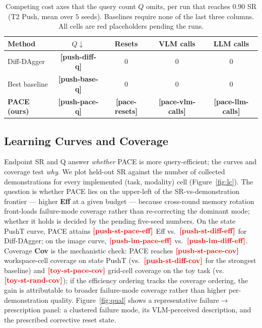 \documentclass[letterpaper]{article} %
\newcommand{\PH}[1]{{\color{red}\textbf{[#1]}}}
\begin{document}
\begin{table}[t]
\centering
\small
\caption{Competing cost axes that the query count $Q$ omits, per run that reaches
$0.90$ SR (T2 Push, mean over $5$ seeds). Baselines require none of the last three
columns. All cells are red placeholders pending the runs.}
\label{tab:cost}
\begin{tabular}{l cccc}
\toprule
Method & $Q\downarrow$ & Resets & VLM calls & LLM calls \\
\midrule
Diff-DAgger          & \PH{push-diff-q}      & $0$ & $0$ & $0$ \\
Best baseline        & \PH{push-base-q}      & $0$ & $0$ & $0$ \\
\textbf{PACE (ours)} & \PH{push-pace-q}      & \PH{pace-resets} & \PH{pace-vlm-calls} & \PH{pace-llm-calls} \\
\bottomrule
\end{tabular}
\end{table}

\subsection{Learning Curves and Coverage}

Endpoint SR and Q answer \emph{whether} PACE is more query-efficient; the curves and
coverage test \emph{why}. We plot held-out SR against the number of collected
demonstrations for every implemented (task, modality) cell (Figure~\ref{fig:lc}). The
question is whether PACE lies on the upper-left of the SR-vs-demonstration frontier
--- higher \textbf{Eff} at a given budget --- because cross-round memory rotation
front-loads failure-mode coverage rather than re-correcting the dominant mode; whether
it holds is decided by the pending five-seed numbers. On the state PushT curve, PACE
attains $\PH{push-st-pace-eff}$ Eff vs.\ $\PH{push-st-diff-eff}$ for Diff-DAgger; on
the image curve, $\PH{push-im-pace-eff}$ vs.\ $\PH{push-im-diff-eff}$. Coverage
\textbf{Cov} is the mechanistic check: PACE reaches $\PH{push-st-pace-cov}$
workspace-cell coverage on state PushT (vs.\ $\PH{push-st-diff-cov}$ for the strongest
baseline) and $\PH{toy-st-pace-cov}$ grid-cell coverage on the toy task (vs.\
$\PH{toy-st-rand-cov}$); if the efficiency ordering tracks the coverage ordering, the
gain is attributable to broader failure-mode coverage rather than higher
per-demonstration quality. Figure~\ref{fig:qual} shows a representative
failure$\to$prescription panel: a clustered failure mode, its VLM-perceived
description, and the prescribed corrective reset state.
\end{document}
